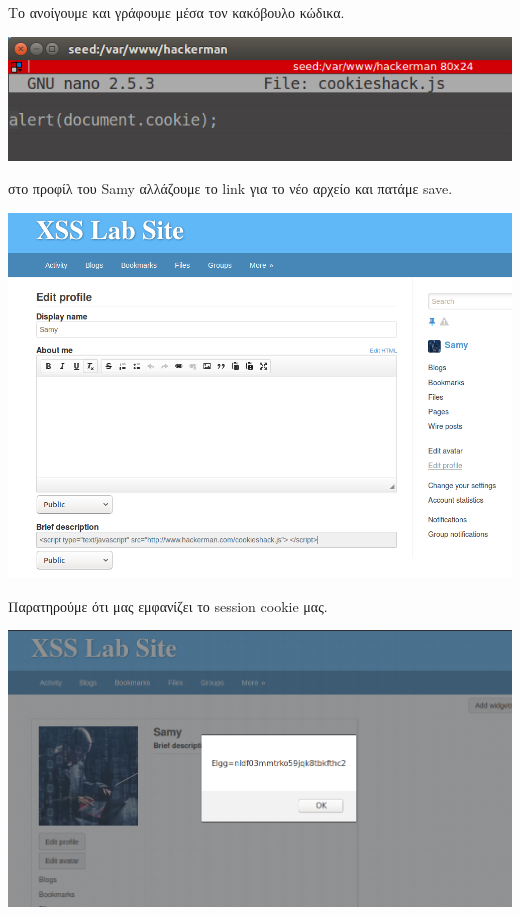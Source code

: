\noindent
Το ανοίγουμε και γράφουμε μέσα τον κακόβουλο κώδικα.

\begin{center}
			\includegraphics[width=1\textwidth]{image/2.2.PNG}		
\end{center}
\noindent στο προφίλ του Samy αλλάζουμε το link για το νέο αρχείο 
και πατάμε save.

\begin{center}
			\includegraphics[width=1\textwidth]{image/2.3.PNG}		
\end{center}
\noindent
Παρατηρούμε ότι μας εμφανίζει το session cookie μας.
\begin{center}
			\includegraphics[width=1\textwidth]{image/2.4.PNG}		
\end{center}
